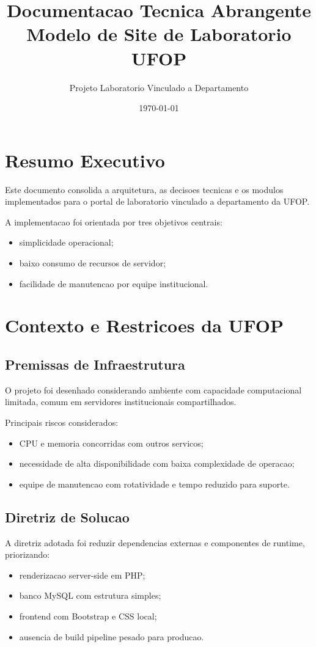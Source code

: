 \documentclass[12pt,a4paper]{article}
\title{Documentacao Tecnica Abrangente\\Modelo de Site de Laboratorio UFOP}
\author{Projeto Laboratorio Vinculado a Departamento}
\date{\today}
\begin{document}
\maketitle
\tableofcontents
\newpage

\section{Resumo Executivo}
Este documento consolida a arquitetura, as decisoes tecnicas e os modulos implementados para o portal de laboratorio vinculado a departamento da UFOP.

A implementacao foi orientada por tres objetivos centrais:
\begin{itemize}
\item simplicidade operacional;
\item baixo consumo de recursos de servidor;
\item facilidade de manutencao por equipe institucional.
\end{itemize}

\section{Contexto e Restricoes da UFOP}
\subsection{Premissas de Infraestrutura}
O projeto foi desenhado considerando ambiente com capacidade computacional limitada, comum em servidores institucionais compartilhados.

Principais riscos considerados:
\begin{itemize}
\item CPU e memoria concorridas com outros servicos;
\item necessidade de alta disponibilidade com baixa complexidade de operacao;
\item equipe de manutencao com rotatividade e tempo reduzido para suporte.
\end{itemize}

\subsection{Diretriz de Solucao}
A diretriz adotada foi reduzir dependencias externas e componentes de runtime, priorizando:
\begin{itemize}
\item renderizacao server-side em PHP;
\item banco MySQL com estrutura simples;
\item frontend com Bootstrap e CSS local;
\item ausencia de build pipeline pesado para producao.
\end{itemize}
\end{document}

